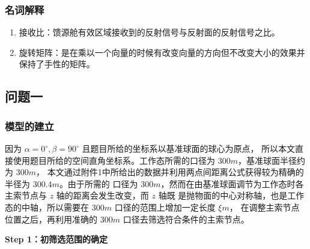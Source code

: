 \documentclass[withoutpreface,bwprint]{cumcmthesis} %
\begin{document}
\subsubsection{名词解释}
\begin{enumerate}
    \item 接收比：馈源舱有效区域接收到的反射信号与反射面的反射信号之比。
    \item 旋转矩阵：是在乘以一个向量的时候有改变向量的方向但不改变大小的效果并保持了手性的矩阵。
\end{enumerate}
\subsection{问题一}
\subsubsection{模型的建立}
因为 $\alpha = 0^\circ ,\beta = 90^\circ$ 且题目所给的坐标系以基准球面的球心为原点，
所以本文直接使用题目所给的空间直角坐标系。工作态所需的口径为 $300m$，基准球面半径约为 $300m$，
本文通过附件1中所给出的数据并利用两点间距离公式获得较为精确的半径为 $300.4m$。由于所需的
口径为 $300m$，然而在由基准球面调节为工作态时各主索节点与 $z$ 轴的距离会发生改变，而 $z$ 轴既
是抛物面的中心对称轴，也是工作态的中轴，所以需要在 $300m$ 口径的范围上增加一定长度 $\xi m$，
在调整主索节点位置之后，再利用准确的 $300m$ 口径去筛选符合条件的主索节点。

\textbf{Step 1：初筛选范围的确定}
\end{document}
